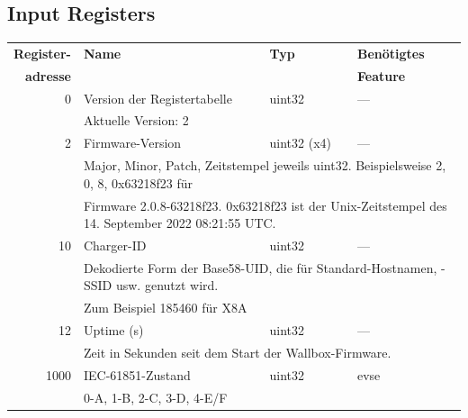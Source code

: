\documentclass[a4paper,10pt]{article}
\newcommand{\tdesc}[1]{\multicolumn{3}{l}{\footnotesize #1}}
\begin{document}
\subsection{Input Registers}
\small
\begin{tabularx}{\textwidth}{rXll} \toprule
    \textbf{Register-} & \textbf{Name}& \textbf{Typ} & \textbf{Benötigtes}                                                      \\
    \textbf{adresse}   &              &              & \textbf{Feature}                                                         \\ \midrule
0             & Version der Registertabelle             & uint32       & ---                                     \\
              & \tdesc{Aktuelle Version: 2}                                                                                     \\ \cmidrule{2-4}
2             & Firmware-Version                       & uint32 (x4)       & ---                                                    \\
              & \tdesc{Major, Minor, Patch, Zeitstempel jeweils uint32. Beispielsweise 2, 0, 8, 0x63218f23 für}                 \\
              & \tdesc{Firmware 2.0.8-63218f23. 0x63218f23 ist der Unix-Zeitstempel des 14. September 2022 08:21:55 UTC.}       \\ \cmidrule{2-4}
10            & Charger-ID                              & uint32       & ---                                                    \\
              & \tdesc{Dekodierte Form der Base58-UID, die für Standard-Hostnamen, -SSID usw. genutzt wird.}                    \\
              & \tdesc{Zum Beispiel 185460 für X8A}                                                                             \\ \cmidrule{2-4}
12            & Uptime (s)                              & uint32       & ---                                                    \\
              & \tdesc{Zeit in Sekunden seit dem Start der Wallbox-Firmware.}                                                   \\ \cmidrule{2-4}
1000          & IEC-61851-Zustand                       & uint32       & evse                                                   \\
              & \tdesc{0-A, 1-B, 2-C, 3-D, 4-E/F}                                                                               \\ \cmidrule{2-4}

\end{tabularx}
\end{document}
